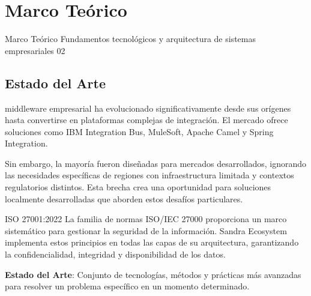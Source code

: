 \chapter{Marco Te\'orico}

\bannerCapitulo
    {Marco Te\'orico}
    {Fundamentos tecnol\'ogicos y arquitectura de sistemas empresariales}
    {02}

\section{Estado del Arte}

 middleware empresarial ha evolucionado significativamente desde sus or\'igenes hasta convertirse en plataformas complejas de integraci\'on. El mercado ofrece soluciones como IBM Integration Bus, MuleSoft, Apache Camel y Spring Integration.

Sin embargo, la mayor\'ia fueron dise\~nadas para mercados desarrollados, ignorando las necesidades espec\'ificas de regiones con infraestructura limitada y contextos regulatorios distintos. Esta brecha crea una oportunidad para soluciones localmente desarrolladas que aborden estos desaf\'ios particulares.

\begin{cajaISO}{ISO 27001:2022}
    La familia de normas ISO/IEC 27000 proporciona un marco sistem\'atico para gestionar la seguridad de la informaci\'on. Sandra Ecosystem implementa estos principios en todas las capas de su arquitectura, garantizando la confidencialidad, integridad y disponibilidad de los datos.
\end{cajaISO}

\begin{definicionMagazine}
\textbf{Estado del Arte}: Conjunto de tecnolog\'ias, m\'etodos y pr\'acticas m\'as avanzadas para resolver un problema espec\'ifico en un momento determinado.
\end{definicionMagazine}

